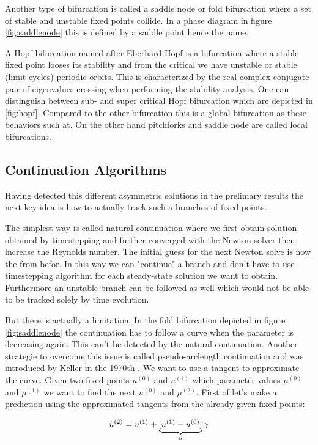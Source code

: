 Another type of bifurcation is called a saddle node or fold bifurcation where a
set of stable and unstable fixed points collide. In a phase diagram in figure
\ref{fig:saddlenode} this is defined by a saddle point hence the name.

A Hopf bifurcation named after Eberhard Hopf is a bifurcation where a stable
fixed point looses its stability and from the critical we have unstable or
stable (limit cycles) periodic orbits. This is characterized by the real
complex conjugate pair of eigenvalues crossing when performing the stability
analysis. One can distinguish between sub- and super critical Hopf bifurcation
which are depicted in \ref{fig:hopf}. Compared to the other bifurcation this is
a global bifurcation as these behaviors such at. On the other hand pitchforks
and saddle node are called local bifurcations.

\subsection{Continuation Algorithms}

Having detected this different asymmetric solutions in the prelimary results
the next key idea is how to actually track such a branches of fixed points.  

The simplest way is called natural continuation where we first obtain
solution obtained by timestepping and further converged with the Newton solver
then increase the Reynolds number. The initial guess for the next Newton solve
is now the from befor. In this way we can "continue" a branch and don't
have to use timestepping algorithm for each steady-state solution we want to
obtain. Furthermore an unstable branch can be followed as well which would not
be able to be tracked solely by time evolution.

But there is actually a limitation. In the fold bifurcation depicted in figure
\ref{fig:saddlenode} the continuation has to follow a curve when the parameter
is decreasing again. This can't be detected by the natural continuation.
Another strategie to overcome this issue is called pseudo-arclength
continuation and was introduced by Keller in the 1970th \citep{}. We want to
use a tangent to approximate the curve. Given two fixed points $u^{(0)}$ and
$u^{(1)}$  which parameter values $\mu^{(0)}$ and $\mu^{(1)}$ we want to find
the next $u^{(0)}$ and $\mu^{(2)}$. First of let's make a prediction using the approximated
tangents from the already given fixed points:

\begin{equation}
  \tilde{u}^{(2)} = u^{(1)}  + \underbrace{[u^{(1)} - u^{(0)}]}_{\text{\normalfont $\hat{u}$}} \gamma
\end{equation}

